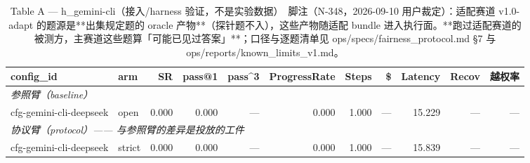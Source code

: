\begin{table}[t]
\centering
\caption{Table A — h\_gemini-cli（接入/harness 验证，不是实验数据）　脚注（N-348，2026-09-10 用户裁定）：适配赛道 v1.0-adapt 的题源是**出集规定题的 oracle 产物**（探针题不入），这些产物随适配 bundle 进入执行面。**跑过适配赛道的被测方，主赛道这些题算「可能已见过答案」**；口径与逐题清单见 ops/specs/fairness\_protocol.md §7 与 ops/reports/known\_limits\_v1.md。}
\label{tab:a-h_gemini-cli}
\begin{tabular}{llrrrrrrrrr}
\toprule
config\_id & arm & SR & pass@1 & pass\^{}3 & ProgressRate & Steps & \$ & Latency & Recov & 越权率 \\
\midrule
\multicolumn{11}{l}{\textit{参照臂（baseline）}} \\
cfg-gemini-cli-deepseek & open & 0.000 & 0.000 & --- & 0.000 & 1.000 & --- & 15.229 & --- & --- \\
\midrule
\multicolumn{11}{l}{\textit{协议臂（protocol）—— 与参照臂的差异是投放的工件}} \\
cfg-gemini-cli-deepseek & strict & 0.000 & 0.000 & --- & 0.000 & 1.000 & --- & 15.839 & --- & --- \\
\bottomrule
\end{tabular}
\end{table}

